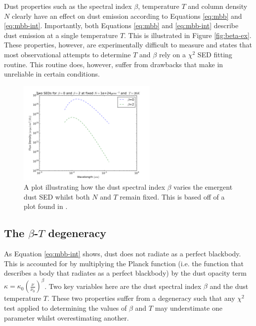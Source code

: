 \documentclass{report}
\begin{document}
Dust properties such as the spectral index $\beta$, temperature $T$ and column density $N$ clearly have an effect on dust emission according to Equations \ref{eq:mbb} and \ref{eq:mbb-int}. Importantly, both Equations \ref{eq:mbb} and \ref{eq:mbb-int} describe dust emission at a single temperature $T$. This is illustrated in Figure \ref{fig:beta-ex}. These properties, however, are experimentally difficult to measure and \textcite{kelly} states that most observational attempts to determine $T$ and $\beta$
rely on a $\chi^{2}$ SED fitting routine. This routine does, however, suffer from drawbacks that make in unreliable in certain conditions.

\begin{figure}[h]
  \begin{center}
    \includegraphics[width=0.6\textwidth]{../img/flux_density_combined.png}
    \caption[A plot illustrating how the dust spectral index $\beta$ varies the emergent dust SED whilst both $N$ and $T$ remain fixed. This is based off of a plot found in \textcite{noise}.]{A plot illustrating how the dust spectral index $\beta$ varies the emergent dust SED whilst both $N$ and $T$ remain fixed. This is based off of a plot found in \textcite{noise}.}
  \end{center}
\end{figure} \label{fig:beta-ex}

\subsection{The $\beta$-$T$ degeneracy}
As Equation \ref{eq:mbb-int} shows, dust does not radiate as a perfect blackbody. This is accounted for by multiplying the Planck function (i.e. the function that describes a body that radiates as a perfect blackbody) by the dust opacity term $\kappa = \kappa_{0}(\frac{\nu}{\nu_{0}})^{\beta}$. Two key variables here are the dust spectral index $\beta$ and the dust temperature $T$. These two properties suffer from a degeneracy \parencite{degen} such that any $\chi^{2}$ test applied to determining the values of $\beta$ and $T$ may understimate one parameter whilst overestimating another.
\end{document}
